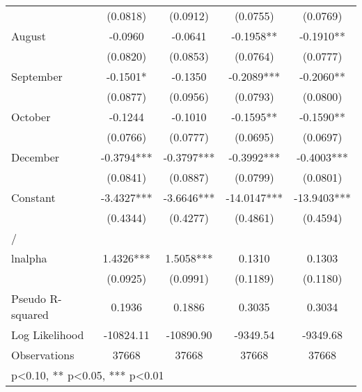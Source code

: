 \begin{table}[htbp]
\begin{tabular}{l*{4}{c}}
                    &    (0.0818)   &    (0.0912)   &    (0.0755)   &    (0.0769)   \\
August              &     -0.0960   &     -0.0641   &     -0.1958** &     -0.1910** \\
                    &    (0.0820)   &    (0.0853)   &    (0.0764)   &    (0.0777)   \\
September           &     -0.1501*  &     -0.1350   &     -0.2089***&     -0.2060** \\
                    &    (0.0877)   &    (0.0956)   &    (0.0793)   &    (0.0800)   \\
October             &     -0.1244   &     -0.1010   &     -0.1595** &     -0.1590** \\
                    &    (0.0766)   &    (0.0777)   &    (0.0695)   &    (0.0697)   \\
December            &     -0.3794***&     -0.3797***&     -0.3992***&     -0.4003***\\
                    &    (0.0841)   &    (0.0887)   &    (0.0799)   &    (0.0801)   \\
Constant            &     -3.4327***&     -3.6646***&    -14.0147***&    -13.9403***\\
                    &    (0.4344)   &    (0.4277)   &    (0.4861)   &    (0.4594)   \\
\hline
/                   &               &               &               &               \\
lnalpha             &      1.4326***&      1.5058***&      0.1310   &      0.1303   \\
                    &    (0.0925)   &    (0.0991)   &    (0.1189)   &    (0.1180)   \\
\hline
Pseudo R-squared    &      0.1936   &      0.1886   &      0.3035   &      0.3034   \\
Log Likelihood      &   -10824.11   &   -10890.90   &    -9349.54   &    -9349.68   \\
Observations        &       37668   &       37668   &       37668   &       37668   \\
\hline\hline
\multicolumn{5}{l}{\footnotesize * p<0.10, ** p<0.05, *** p<0.01}\\
\end{tabular}
\end{table}
